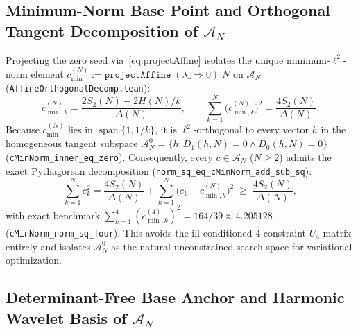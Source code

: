\documentclass[11pt,a4paper]{article}
\theoremstyle{definition}
\begin{document}
\subsection{Minimum-Norm Base Point and Orthogonal Tangent Decomposition of \texorpdfstring{$\mathcal{A}_N$}{A\_N}}

Projecting the zero seed via~\eqref{eq:projectAffine} isolates the unique minimum-$\ell^2$-norm element $c_{\min}^{(N)} := \texttt{projectAffine}\;(\lambda \_ \Rightarrow 0)\;N$ on $\mathcal{A}_N$ (\texttt{AffineOrthogonalDecomp.lean}):
\begin{equation}
c_{\min,k}^{(N)} = \frac{2 S_2(N) - 2 H(N) / k}{\Delta(N)}, \qquad
\sum_{k=1}^N \big(c_{\min,k}^{(N)}\big)^2 = \frac{4 S_2(N)}{\Delta(N)}.
\end{equation}
Because $c_{\min}^{(N)}$ lies in $\operatorname{span}\{1, 1/k\}$, it is $\ell^2$-orthogonal to every vector $h$ in the homogeneous tangent subspace $\mathcal{A}_N^0 = \{h : D_1(h, N) = 0 \land D_0(h, N) = 0\}$ (\texttt{cMinNorm\_\allowbreak inner\_\allowbreak eq\_\allowbreak zero}). Consequently, every $c \in \mathcal{A}_N$ ($N \ge 2$) admits the exact Pythagorean decomposition (\texttt{norm\_\allowbreak sq\_\allowbreak eq\_\allowbreak cMinNorm\_\allowbreak add\_\allowbreak sub\_\allowbreak sq}):
\begin{equation}
\sum_{k=1}^N c_k^2 = \frac{4 S_2(N)}{\Delta(N)} + \sum_{k=1}^N \big(c_k - c_{\min,k}^{(N)}\big)^2
\;\ge\; \frac{4 S_2(N)}{\Delta(N)},
\end{equation}
with exact benchmark $\sum_{k=1}^4 (c_{\min,k}^{(4)})^2 = 164/39 \approx 4.205128$ (\texttt{cMinNorm\_\allowbreak norm\_\allowbreak sq\_\allowbreak four}). This avoids the ill-conditioned $4$-constraint $U_4$ matrix entirely and isolates $\mathcal{A}_N^0$ as the natural unconstrained search space for variational optimization.

\subsection{Determinant-Free Base Anchor and Harmonic Wavelet Basis of \texorpdfstring{$\mathcal{A}_N$}{A\_N}}
\end{document}
